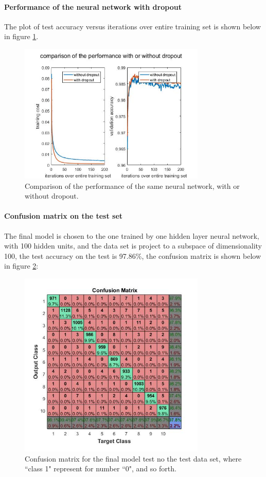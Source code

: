 \documentclass[conference]{IEEEtran}
\begin{document}
\paragraph{Performance of the neural network with dropout}
The plot of test accuracy versus  iterations over entire training set is shown below in figure \ref{dO}.
\begin{figure}[h!]
\centerline{\includegraphics[width=3.5in]{dropoutPlot.jpg}}
\caption{Comparison of the performance of the same neural network, with or without dropout.}
\label{dO}
\end{figure}


\paragraph{Confusion matrix on the test set}
The final model is chosen to the one trained by one hidden layer neural network, with 100 hidden units, and the data set is project to a subspace of dimensionality 100, the test accuracy on the test is 97.86\%, the confusion matrix is shown below in figure \ref{confu}:
\begin{figure}[h!]
\centerline{\includegraphics[width=3.5in]{confu.jpg}}
\caption{Confusion matrix for the final model test no the test data set, where ``class 1" represent for number ``0", and so forth.}
\label{confu}
\end{figure}
\end{document}

